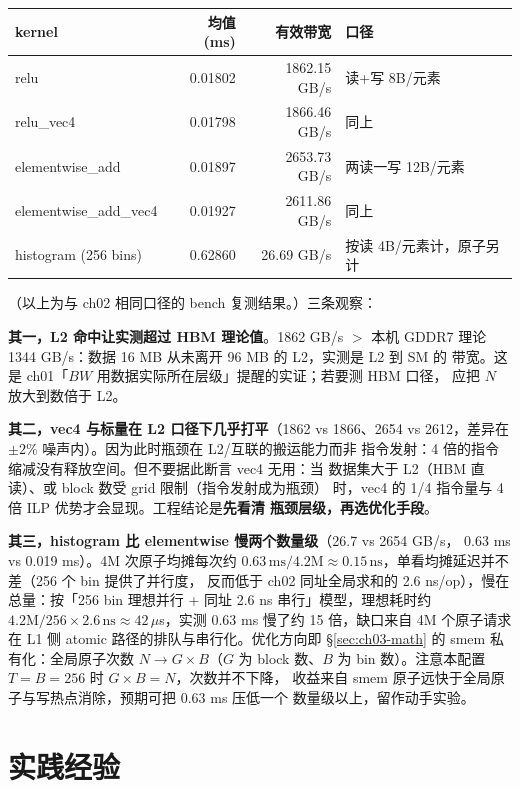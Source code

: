 \begin{center}
\begin{tabular}{lrrl}
\toprule
kernel & 均值 (ms) & 有效带宽 & 口径 \\
\midrule
relu & 0.01802 & 1862.15 GB/s & 读+写 8B/元素 \\
relu\_vec4 & 0.01798 & 1866.46 GB/s & 同上 \\
elementwise\_add & 0.01897 & 2653.73 GB/s & 两读一写 12B/元素 \\
elementwise\_add\_vec4 & 0.01927 & 2611.86 GB/s & 同上 \\
histogram (256 bins) & 0.62860 & 26.69 GB/s & 按读 4B/元素计，原子另计 \\
\bottomrule
\end{tabular}
\end{center}

（以上为与 ch02 相同口径的 bench 复测结果。）三条观察：

\textbf{其一，L2 命中让实测超过 HBM 理论值}。1862 GB/s $>$ 本机 GDDR7
理论 1344 GB/s：数据 16 MB 从未离开 96 MB 的 L2，实测是 L2 到 SM 的
带宽。这是 ch01「$BW$ 用数据实际所在层级」提醒的实证；若要测 HBM 口径，
应把 $N$ 放大到数倍于 L2。

\textbf{其二，vec4 与标量在 L2 口径下几乎打平}（1862 vs 1866、2654 vs
2612，差异在 $\pm 2\%$ 噪声内）。因为此时瓶颈在 L2/互联的搬运能力而非
指令发射：4 倍的指令缩减没有释放空间。但不要据此断言 vec4 无用：当
数据集大于 L2（HBM 直读）、或 block 数受 grid 限制（指令发射成为瓶颈）
时，vec4 的 1/4 指令量与 4 倍 ILP 优势才会显现。工程结论是\textbf{先看清
瓶颈层级，再选优化手段}。

\textbf{其三，histogram 比 elementwise 慢两个数量级}（26.7 vs 2654 GB/s，
0.63 ms vs 0.019 ms）。4M 次原子均摊每次约 $0.63\,\mathrm{ms}/4.2\mathrm{M}
\approx 0.15\,\mathrm{ns}$，单看均摊延迟并不差（256 个 bin 提供了并行度，
反而低于 ch02 同址全局求和的 2.6 ns/op），慢在总量：按「256 bin 理想并行
+ 同址 2.6 ns 串行」模型，理想耗时约 $4.2\mathrm{M}/256 \times 2.6\,\mathrm{ns}
\approx 42\,\mu$s，实测 0.63 ms 慢了约 15 倍，缺口来自 4M 个原子请求在
L1 侧 atomic 路径的排队与串行化。优化方向即 \S\ref{sec:ch03-math} 的 smem
私有化：全局原子次数 $N \to G \times B$（$G$ 为 block 数、$B$ 为
bin 数）。注意本配置 $T{=}B{=}256$ 时 $G \times B = N$，次数并不下降，
收益来自 smem 原子远快于全局原子与写热点消除，预期可把 0.63 ms 压低一个
数量级以上，留作动手实验。

\section{实践经验}\label{sec:ch03-kaogu}


